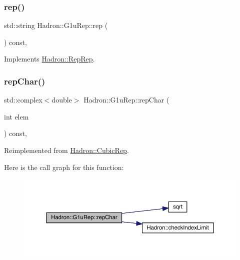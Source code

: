 \mbox{\label{structHadron_1_1G1uRep_a3c25822b246f892ed1eef8aeb4ae8252}} 
\subsubsection{\texorpdfstring{rep()}{rep()}\hspace{0.1cm}{\footnotesize\ttfamily [3/3]}}
{\footnotesize\ttfamily std\+::string Hadron\+::\+G1u\+Rep\+::rep (\begin{DoxyParamCaption}{ }\end{DoxyParamCaption}) const\hspace{0.3cm}{\ttfamily [inline]}, {\ttfamily [virtual]}}



Implements \mbox{\hyperlink{structHadron_1_1RepRep_ab3213025f6de249f7095892109575fde}{Hadron\+::\+Rep\+Rep}}.

\mbox{\label{structHadron_1_1G1uRep_a3d37407f93af4c955c024aafa0948bcb}} 
\subsubsection{\texorpdfstring{repChar()}{repChar()}\hspace{0.1cm}{\footnotesize\ttfamily [1/2]}}
{\footnotesize\ttfamily std\+::complex$<$double$>$ Hadron\+::\+G1u\+Rep\+::rep\+Char (\begin{DoxyParamCaption}\item[{int}]{elem }\end{DoxyParamCaption}) const\hspace{0.3cm}{\ttfamily [inline]}, {\ttfamily [virtual]}}



Reimplemented from \mbox{\hyperlink{structHadron_1_1CubicRep_af45227106e8e715e84b0af69cd3b36f8}{Hadron\+::\+Cubic\+Rep}}.

Here is the call graph for this function\+:
\nopagebreak
\begin{figure}[H]
\begin{center}
\leavevmode
\includegraphics[width=350pt]{d8/d42/structHadron_1_1G1uRep_a3d37407f93af4c955c024aafa0948bcb_cgraph}
\end{center}
\end{figure}
\mbox{\label{structHadron_1_1G1uRep_a3d37407f93af4c955c024aafa0948bcb}} 
